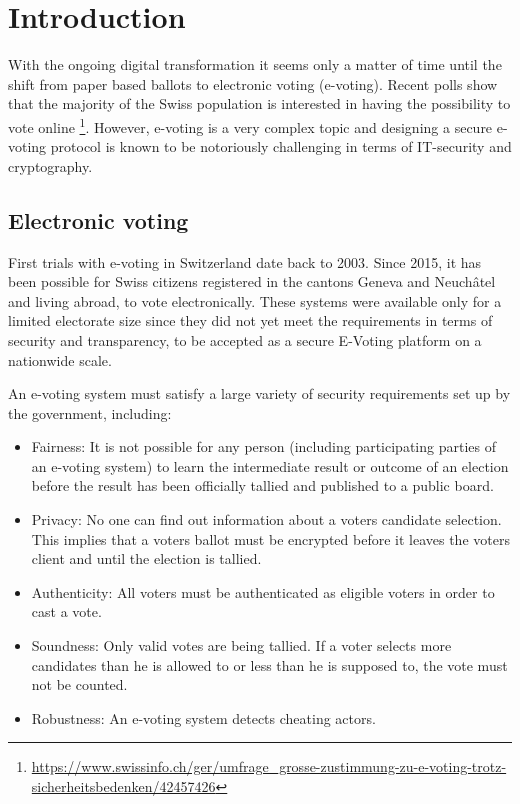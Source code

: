 \chapter{Introduction}
With the ongoing digital transformation it seems only a matter of time until the shift from paper based ballots to electronic voting (e-voting). Recent polls show that the majority of the Swiss population is interested in having the possibility to vote online \footnote{\url{https://www.swissinfo.ch/ger/umfrage_grosse-zustimmung-zu-e-voting-trotz-sicherheitsbedenken/42457426}}. However, e-voting is a very complex topic and designing a secure e-voting protocol is known to be notoriously challenging in terms of IT-security and cryptography.

\section{Electronic voting}
First trials with e-voting in Switzerland date back to 2003. Since 2015, it has been possible for Swiss citizens registered in the cantons Geneva and Neuchâtel and living abroad, to vote electronically. These systems were available only for a limited electorate size since they did not yet meet the requirements in terms of security and transparency, to be accepted as a secure E-Voting platform on a nationwide scale.

An e-voting system must satisfy a large variety of security requirements set up by the government, including:

\begin{itemize}
	\item Fairness: It is not possible for any person (including participating parties of an e-voting system) to learn the intermediate result or outcome of an election before the result has been officially tallied and published to a public board.
	\item Privacy: No one can find out information about a voters candidate selection. This implies that a voters ballot must be encrypted before it leaves the voters client and until the election is tallied.
	\item Authenticity: All voters must be authenticated as eligible voters in order to cast a vote.
	\item Soundness: Only valid votes are being tallied. If a voter selects more candidates than he is allowed to or less than he is supposed to, the vote must not be counted.
	\item Robustness: An e-voting system detects cheating actors.
\end{itemize}

